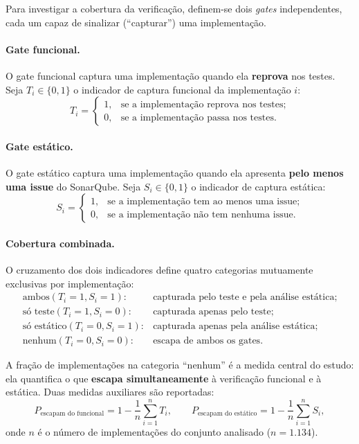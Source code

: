 Para investigar a cobertura da verificação, definem-se dois \textit{gates} independentes, cada um capaz de sinalizar (``capturar'') uma implementação.

\paragraph{Gate funcional.} O gate funcional captura uma implementação quando ela \textbf{reprova} nos testes. Seja $T_i \in \{0,1\}$ o indicador de captura funcional da implementação $i$:
\[
T_i =
\begin{cases}
1, & \text{se a implementação reprova nos testes;}\\
0, & \text{se a implementação passa nos testes.}
\end{cases}
\]

\paragraph{Gate estático.} O gate estático captura uma implementação quando ela apresenta \textbf{pelo menos uma issue} do SonarQube. Seja $S_i \in \{0,1\}$ o indicador de captura estática:
\[
S_i =
\begin{cases}
1, & \text{se a implementação tem ao menos uma issue;}\\
0, & \text{se a implementação não tem nenhuma issue.}
\end{cases}
\]

\paragraph{Cobertura combinada.} O cruzamento dos dois indicadores define quatro categorias mutuamente exclusivas por implementação:
\[
\begin{array}{ll}
\text{ambos} (T_i{=}1, S_i{=}1): & \text{capturada pelo teste e pela análise estática;}\\
\text{só teste} (T_i{=}1, S_i{=}0): & \text{capturada apenas pelo teste;}\\
\text{só estático} (T_i{=}0, S_i{=}1): & \text{capturada apenas pela análise estática;}\\
\text{nenhum} (T_i{=}0, S_i{=}0): & \text{escapa de ambos os gates.}
\end{array}
\]

A fração de implementações na categoria ``nenhum'' é a medida central do estudo: ela quantifica o que \textbf{escapa simultaneamente} à verificação funcional e à estática. Duas medidas auxiliares são reportadas:
\[
P_{\text{escapam do funcional}} = 1 - \frac{1}{n}\sum_{i=1}^{n} T_i,
\qquad
P_{\text{escapam do estático}} = 1 - \frac{1}{n}\sum_{i=1}^{n} S_i,
\]
onde $n$ é o número de implementações do conjunto analisado ($n = 1.134$).

